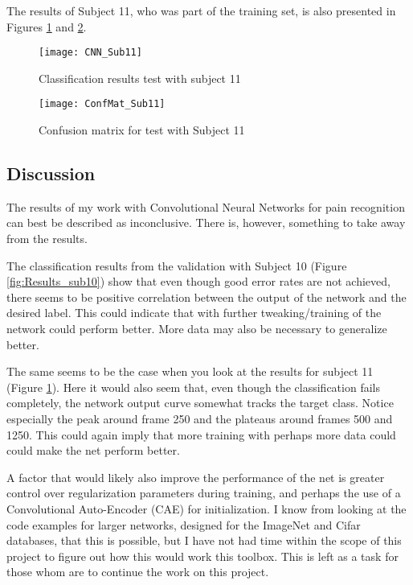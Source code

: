 \documentclass[Main]{subfiles}
\begin{document}
		The results of Subject 11, who was part of the training set, is also presented in Figures \ref{fig:Results_sub11} and \ref{fig:cnn_conf11}.
		\vspace{1cm}
		\begin{figure}[H]
			\begin{center}
				\texttt{[image: CNN\_Sub11]}
			\end{center}
			\caption{Classification results test with subject 11}
			\label{fig:Results_sub11}
		\end{figure}

		\begin{figure}[H]
			\begin{center}
				\texttt{[image: ConfMat\_Sub11]}
			\end{center}
			\caption{Confusion matrix for test with Subject 11}
			\label{fig:cnn_conf11}
		\end{figure}

	\newpage
	\subsection{Discussion} %
		\label{sub:cnn_discussion}
		The results of my work with Convolutional Neural Networks for pain recognition can best be described as inconclusive.
		There is, however, something to take away from the results.

		The classification results from the validation with Subject 10 (Figure \ref{fig:Results_sub10}) show that even though good error rates are not achieved, there seems to be positive correlation between the output of the network and the desired label.
		This could indicate that with further tweaking/training of the network could perform better.
		More data may also be necessary to generalize better.

		The same seems to be the case when you look at the results for subject 11 (Figure \ref{fig:Results_sub11}).
		Here it would also seem that, even though the classification fails completely, the network output curve somewhat tracks the target class.
		Notice especially the peak around frame 250 and the plateaus around frames 500 and 1250.
		This could again imply that more training with perhaps more data could could make the net perform better.

		A factor that would likely also improve the performance of the net is greater control over regularization parameters during training, and perhaps the use of a Convolutional Auto-Encoder (CAE) for initialization.
		I know from looking at the code examples for larger networks, designed for the ImageNet \cite{Deng09imagenet:a} and Cifar \cite{Krizhevsky09cifar} databases, that this is possible, but I have not had time within the scope of this project to figure out how this would work this toolbox.
		This is left as a task for those whom are to continue the work on this project.


\end{document}
